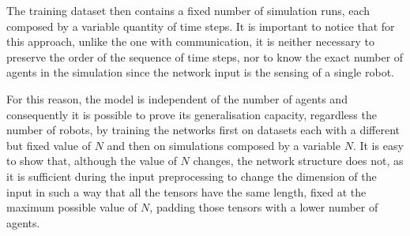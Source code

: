 The training dataset then contains a fixed number of simulation runs, each 
composed by a variable quantity of time steps. It is important to notice that 
for this approach, unlike the one with communication, it is neither necessary to 
preserve the order of the sequence of time steps, nor to know the exact number 
of agents in the simulation since the network input is the sensing of a single robot.

For this reason, the model is independent of the number of agents and 
consequently it is possible to prove its generalisation capacity, regardless the 
number of robots, by training the networks first on datasets each with a different 
but fixed value of $N$ and then on simulations composed by a variable $N$.
It is easy to show that, although the value of $N$ changes, the network structure 
does not, as it is sufficient during the input preprocessing to change the 
dimension of the input in such a way that all the tensors have the same length, 
fixed at the maximum possible value of $N$, padding those tensors with a lower 
number of agents.

